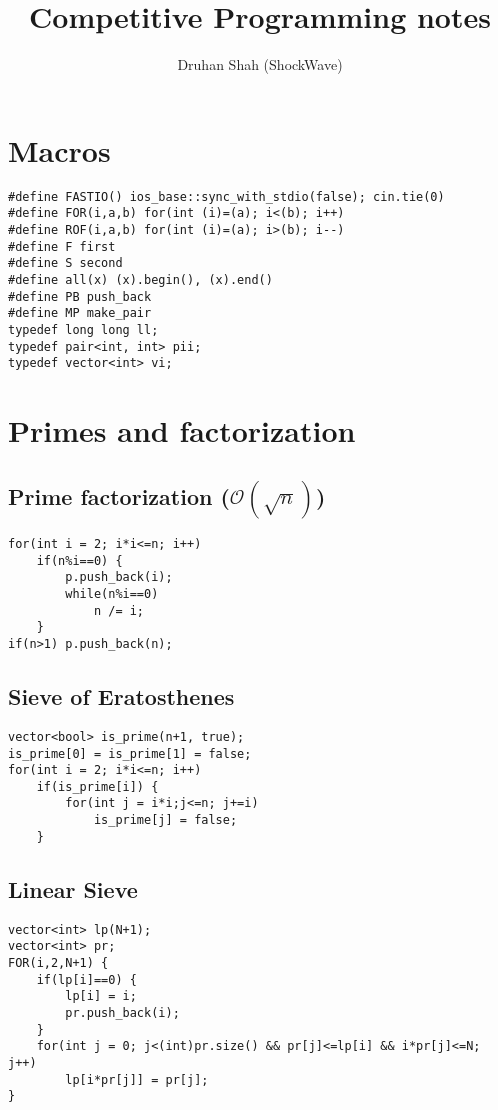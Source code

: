 \documentclass{article}
\author{Druhan Shah (ShockWave)}
\title{Competitive Programming notes}
\begin{document}
    \maketitle
    \tableofcontents
	\section*{Macros}

	
	\begin{lstlisting}
#define FASTIO() ios_base::sync_with_stdio(false); cin.tie(0)
#define FOR(i,a,b) for(int (i)=(a); i<(b); i++)
#define ROF(i,a,b) for(int (i)=(a); i>(b); i--)
#define F first
#define S second
#define all(x) (x).begin(), (x).end()
#define PB push_back
#define MP make_pair
typedef long long ll;
typedef pair<int, int> pii;
typedef vector<int> vi;\end{lstlisting}

    \section{Primes and factorization}
        \subsection{Prime factorization ($\mathcal{O}(\sqrt{n})$)}
        

        \begin{lstlisting}
for(int i = 2; i*i<=n; i++)
    if(n%i==0) {
        p.push_back(i);
        while(n%i==0)
            n /= i;
    }
if(n>1) p.push_back(n);   \end{lstlisting}


        \subsection{Sieve of Eratosthenes}

        \begin{lstlisting}
vector<bool> is_prime(n+1, true);
is_prime[0] = is_prime[1] = false;
for(int i = 2; i*i<=n; i++)
    if(is_prime[i]) {
        for(int j = i*i;j<=n; j+=i)
            is_prime[j] = false;
    }   \end{lstlisting}

        \subsection{Linear Sieve}
        

        \begin{lstlisting}
vector<int> lp(N+1);
vector<int> pr;
FOR(i,2,N+1) {
    if(lp[i]==0) {
        lp[i] = i;
        pr.push_back(i);
    }
    for(int j = 0; j<(int)pr.size() && pr[j]<=lp[i] && i*pr[j]<=N; j++)
        lp[i*pr[j]] = pr[j];
}       \end{lstlisting}
\end{document}
